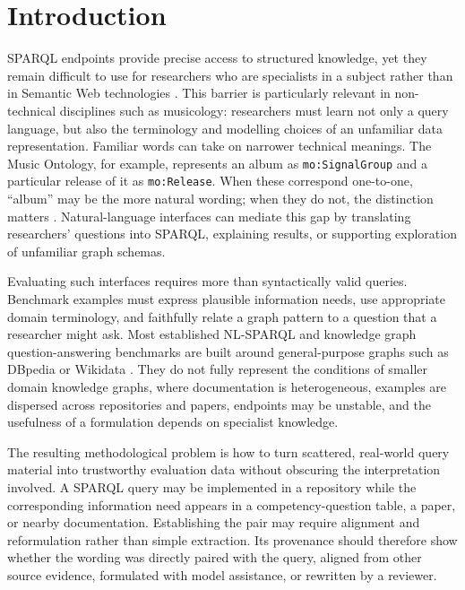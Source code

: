\section{Introduction}\label{introduction}

SPARQL endpoints provide precise access to structured knowledge, yet they remain difficult to use for researchers who are specialists in a subject rather than in Semantic Web technologies \citep{harris2013sparql}. This barrier is particularly relevant in non-technical disciplines such as musicology: researchers must learn not only a query language, but also the terminology and modelling choices of an unfamiliar data representation. Familiar words can take on narrower technical meanings. The Music Ontology, for example, represents an album as \texttt{mo:SignalGroup} and a particular release of it as \texttt{mo:Release}. When these correspond one-to-one, ``album'' may be the more natural wording; when they do not, the distinction matters \citep{raimond2007music}. Natural-language interfaces can mediate this gap by translating researchers' questions into SPARQL, explaining results, or supporting exploration of unfamiliar graph schemas.

Evaluating such interfaces requires more than syntactically valid queries. Benchmark examples must express plausible information needs, use appropriate domain terminology, and faithfully relate a graph pattern to a question that a researcher might ask. Most established NL-SPARQL and knowledge graph question-answering benchmarks are built around general-purpose graphs such as DBpedia or Wikidata \citep{lopez2013evaluating, trivedi2017lcquad, dubey2019lcquad2}. They do not fully represent the conditions of smaller domain knowledge graphs, where documentation is heterogeneous, examples are dispersed across repositories and papers, endpoints may be unstable, and the usefulness of a formulation depends on specialist knowledge.

The resulting methodological problem is how to turn scattered, real-world query material into trustworthy evaluation data without obscuring the interpretation involved. A SPARQL query may be implemented in a repository while the corresponding information need appears in a competency-question table, a paper, or nearby documentation. Establishing the pair may require alignment and reformulation rather than simple extraction. Its provenance should therefore show whether the wording was directly paired with the query, aligned from other source evidence, formulated with model assistance, or rewritten by a reviewer.


